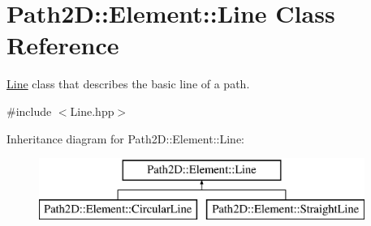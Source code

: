 \hypertarget{class_path2_d_1_1_element_1_1_line}{}\section{Path2D\+:\+:Element\+:\+:Line Class Reference}
\label{class_path2_d_1_1_element_1_1_line}


\mbox{\hyperlink{class_path2_d_1_1_element_1_1_line}{Line}} class that describes the basic line of a path.  




{\ttfamily \#include $<$Line.\+hpp$>$}

Inheritance diagram for Path2D\+:\+:Element\+:\+:Line\+:\begin{figure}[H]
\begin{center}
\leavevmode
\includegraphics[height=2.000000cm]{class_path2_d_1_1_element_1_1_line}
\end{center}
\end{figure}
